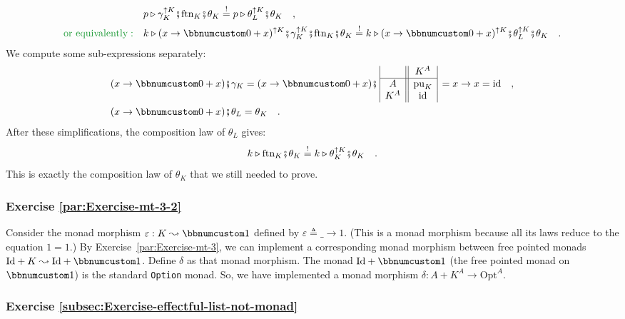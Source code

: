 \begin{align*}
 & p\triangleright\gamma_{K}^{\uparrow K}\bef\text{ftn}_{K}\bef\theta_{K}\overset{!}{=}p\triangleright\theta_{L}^{\uparrow K}\bef\theta_{K}\quad,\\
{\color{greenunder}\text{or equivalently}:}\quad & k\triangleright(x\rightarrow\bbnum 0+x)^{\uparrow K}\bef\gamma_{K}^{\uparrow K}\bef\text{ftn}_{K}\bef\theta_{K}\overset{!}{=}k\triangleright(x\rightarrow\bbnum 0+x)^{\uparrow K}\bef\theta_{L}^{\uparrow K}\bef\theta_{K}\quad.
\end{align*}
We compute some sub-expressions separately:
\begin{align*}
 & (x\rightarrow\bbnum 0+x)\bef\gamma_{K}=(x\rightarrow\bbnum 0+x)\bef\,\begin{array}{|c||c|}
 & K^{A}\\
\hline A & \text{pu}_{K}\\
K^{A} & \text{id}
\end{array}\,=x\rightarrow x=\text{id}\quad,\\
 & (x\rightarrow\bbnum 0+x)\bef\theta_{L}=\theta_{K}\quad.
\end{align*}
After these simplifications, the composition law of $\theta_{L}$
gives:
\[
k\triangleright\text{ftn}_{K}\bef\theta_{K}\overset{!}{=}k\triangleright\theta_{K}^{\uparrow K}\bef\theta_{K}\quad.
\]
This is exactly the composition law of $\theta_{K}$ that we still
needed to prove.

\subsubsection*{Exercise \ref{par:Exercise-mt-3-2}}

Consider the monad morphism $\varepsilon:K\leadsto\bbnum 1$ defined
by $\varepsilon\triangleq\_\rightarrow1$. (This is a monad morphism
because all its laws reduce to the equation $1=1$.) By Exercise~\ref{par:Exercise-mt-3},
we can implement a corresponding monad morphism between free pointed
monads $\text{Id}+K\leadsto\text{Id}+\bbnum 1$. Define $\delta$
as that monad morphism. The monad $\text{Id}+\bbnum 1$ (the free
pointed monad on $\bbnum 1$) is the standard \lstinline!Option!
monad. So, we have implemented a monad morphism $\delta:A+K^{A}\rightarrow\text{Opt}^{A}$.

\subsubsection*{Exercise \ref{subsec:Exercise-effectful-list-not-monad}}

